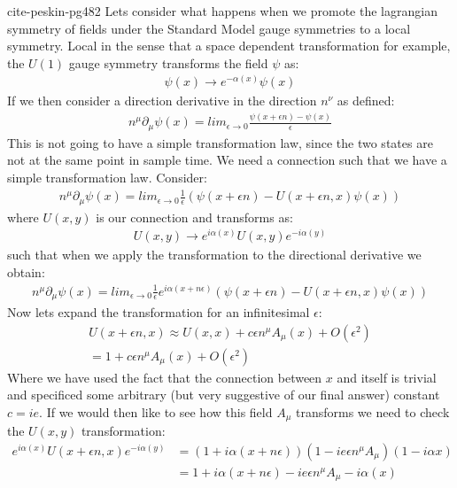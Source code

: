 cite-peskin-pg482
Lets consider what happens when we promote the lagrangian symmetry of fields under the Standard Model gauge symmetries
to a local symmetry. Local in the sense that a space dependent transformation   for example, the $U(1)$ gauge symmetry transforms the field $\psi$ as:
\begin{align*}
\psi(x) \rightarrow e^{- \alpha(x)} \psi(x)
\end{align*}
If we then consider a direction derivative in the direction $n^\nu$ as defined:
\begin{align*}
n^\mu \partial _\mu \psi (x) = lim_{\epsilon\rightarrow 0} \frac{\psi(x + \epsilon n) - \psi(x)}{\epsilon}
\end{align*}
This is not going to have a simple transformation law, since the two states are not at the same
point in sample time. We need a connection such that we have a simple transformation law. Consider:
\begin{align*}
n^\mu \partial _\mu \psi (x) = lim_{\epsilon\rightarrow 0} \frac{1}{\epsilon} \left ( \psi(x + \epsilon n) - U(x+\epsilon n, x) \psi(x) \right)
\end{align*}
where $U(x,y)$ is our connection and transforms as:
\begin{align*}
U(x,y) \rightarrow e^{i\alpha(x)} U(x,y) e^{-i\alpha (y)}
\end{align*}
such that when we apply the transformation  to the directional derivative we obtain:
\begin{align*}
n^\mu \partial _\mu \psi (x) = lim_{\epsilon\rightarrow 0} \frac{1}{\epsilon} e^{i\alpha(x+n\epsilon)} \left ( \psi(x + \epsilon n) - U(x+\epsilon n, x) \psi(x) \right)
\end{align*}
Now lets expand the transformation for an infinitesimal $\epsilon$:
\begin{align*}
U(x+\epsilon n, x) \approx U(x,x) + c\epsilon n^\mu A_\mu (x) + O(\epsilon^2)\\
= 1 + c\epsilon n^\mu A_\mu (x) + O(\epsilon^2)
\end{align*}
Where we have used the fact that the connection between $x$ and itself is trivial and specificed some arbitrary (but very suggestive of our final answer) constant $c = ie$.
If we would then like to see how this field $A_\mu$ transforms we need to check the $U(x,y)$ transformation:
\begin{align*}
e^{i\alpha(x)} U(x+\epsilon n,x) e^{-i\alpha (y)} &= (1 + i \alpha(x+n\epsilon)) (1-ie\epsilon n^\mu A_\mu)(1 - i \alpha x) \\
&= 1 + i \alpha (x+n\epsilon ) - ie \epsilon n^\mu A_\mu - i\alpha(x)
\end{align*}
